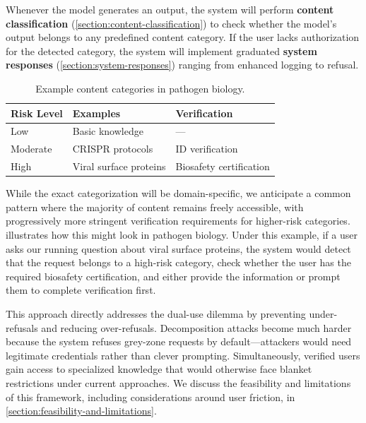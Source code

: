 \documentclass{article}
\theoremstyle{plain}
\theoremstyle{definition}
\theoremstyle{remark}
\begin{document}
Whenever the model generates an output, the system will perform \textbf{content classification} (\cref{section:content-classification}) to check whether the model's output belongs to any predefined content category.
If the user lacks authorization for the detected category, the system will implement graduated \textbf{system responses} (\cref{section:system-responses}) ranging from enhanced logging to refusal.

\begin{table}[t]
  \caption{Example content categories in pathogen biology.}
  \vspace{0.1in}
  \label{table:biology-examples}
  \centering
  \small
  \begin{tabular}{lll}
    \toprule
    \textbf{Risk Level} & \textbf{Examples} & \textbf{Verification} \\
    \midrule
    Low & Basic knowledge & --- \\
    Moderate & CRISPR protocols & ID verification \\
    High & Viral surface proteins & Biosafety certification \\
    \bottomrule
  \end{tabular}
\end{table}

While the exact categorization will be domain-specific, we anticipate a common pattern where the majority of content remains freely accessible, with progressively more stringent verification requirements for higher-risk categories.
 illustrates how this might look in pathogen biology.
Under this example, if a user asks our running question about viral surface proteins, the system would detect that the request belongs to a high-risk category, check whether the user has the required biosafety certification, and either provide the information or prompt them to complete verification first.

This approach directly addresses the dual-use dilemma by preventing under-refusals and reducing over-refusals.
Decomposition attacks become much harder because the system refuses grey-zone requests by default—attackers would need legitimate credentials rather than clever prompting.
Simultaneously, verified users gain access to specialized knowledge that would otherwise face blanket restrictions under current approaches.
We discuss the feasibility and limitations of this framework, including considerations around user friction, in \cref{section:feasibility-and-limitations}.
\end{document}
